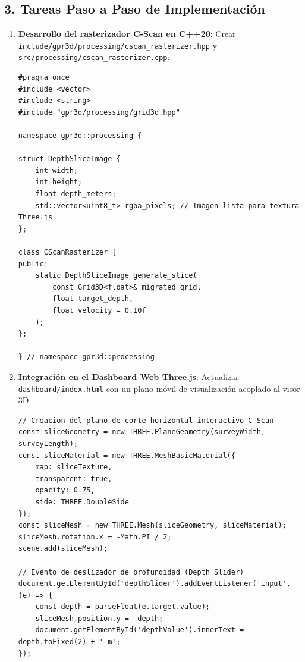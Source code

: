 \documentclass[11pt,a4paper]{article}
\begin{document}
\subsection{3. Tareas Paso a Paso de Implementaci{\'o}n}

\begin{enumerate}
    \item \textbf{Desarrollo del rasterizador C-Scan en C++20}:
    Crear \texttt{include/gpr3d/processing/cscan\_rasterizer.hpp} y \texttt{src/processing/cscan\_rasterizer.cpp}:
\begin{verbatim}
#pragma once
#include <vector>
#include <string>
#include "gpr3d/processing/grid3d.hpp"

namespace gpr3d::processing {

struct DepthSliceImage {
    int width;
    int height;
    float depth_meters;
    std::vector<uint8_t> rgba_pixels; // Imagen lista para textura Three.js
};

class CScanRasterizer {
public:
    static DepthSliceImage generate_slice(
        const Grid3D<float>& migrated_grid,
        float target_depth,
        float velocity = 0.10f
    );
};

} // namespace gpr3d::processing
\end{verbatim}

    \item \textbf{Integraci{\'o}n en el Dashboard Web Three.js}:
    Actualizar \texttt{dashboard/index.html} con un plano m{\'o}vil de visualizaci{\'o}n acoplado al visor 3D:
\begin{verbatim}
// Creacion del plano de corte horizontal interactivo C-Scan
const sliceGeometry = new THREE.PlaneGeometry(surveyWidth, surveyLength);
const sliceMaterial = new THREE.MeshBasicMaterial({
    map: sliceTexture,
    transparent: true,
    opacity: 0.75,
    side: THREE.DoubleSide
});
const sliceMesh = new THREE.Mesh(sliceGeometry, sliceMaterial);
sliceMesh.rotation.x = -Math.PI / 2;
scene.add(sliceMesh);

// Evento de deslizador de profundidad (Depth Slider)
document.getElementById('depthSlider').addEventListener('input', (e) => {
    const depth = parseFloat(e.target.value);
    sliceMesh.position.y = -depth;
    document.getElementById('depthValue').innerText = depth.toFixed(2) + ' m';
});
\end{verbatim}
\end{enumerate}
\end{document}

